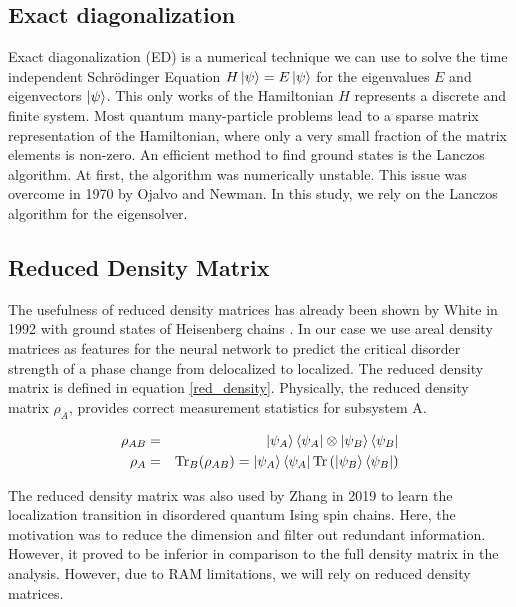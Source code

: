 \documentclass[reprint,amsmath,amssymb,aps,prb]{revtex4-2}
\begin{document}
\subsection{Exact diagonalization}

Exact diagonalization (ED) is a numerical technique we can use to solve the time independent Schrödinger Equation $H\ket{\psi}=E\ket{\psi}$ for the eigenvalues $E$ and eigenvectors $\ket{\psi}$. This only works of the Hamiltonian $H$ represents a discrete and finite system. Most quantum many-particle problems lead to a sparse matrix representation of the Hamiltonian, where only a very small fraction of the matrix
elements is non-zero.\cite{Weisse2008} An efficient method to find ground states is the Lanczos algorithm.\cite{Lanczos1950} At first, the algorithm was numerically unstable. This issue was overcome in 1970 by Ojalvo and Newman.\cite{Ojalvo1970} In this study, we rely on the Lanczos algorithm for the eigensolver.

\subsection{Reduced Density Matrix}

The usefulness of reduced density matrices has already been shown by White in 1992 with ground states of Heisenberg chains \cite{White1992}. In our case we use areal density matrices as features for the neural network to predict the critical disorder strength of a phase change from delocalized to localized. The reduced density matrix is defined in equation \ref{red_density}. Physically, the reduced density matrix $\rho_A$, provides correct measurement statistics for subsystem A.

\begin{eqnarray}
\rho_{AB}&=&\ket{\psi_A}\bra{\psi_A}\otimes\ket{\psi_B}\bra{\psi_B}\\
\rho_A&=&\text{Tr}_B(\rho_{AB})=\ket{\psi_A}\bra{\psi_A}\text{Tr}\left(\ket{\psi_B}\bra{\psi_B}\right)\label{red_density}
\end{eqnarray}%

The reduced density matrix was also used by Zhang in 2019 to learn the localization transition in disordered quantum Ising spin chains. Here, the motivation was to reduce the dimension and filter out redundant information. However, it proved to be inferior in comparison to the full density matrix in the analysis. \cite{Zhang2019} However, due to RAM limitations, we will rely on reduced density matrices.
\end{document}
